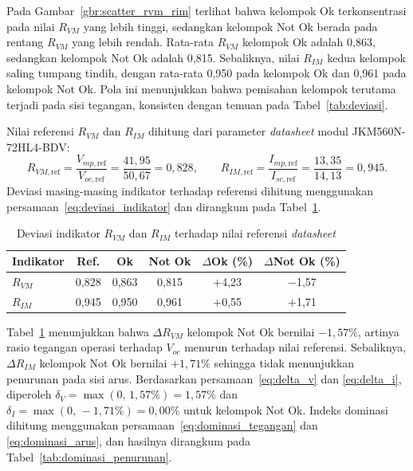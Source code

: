 Pada Gambar~\ref{gbr:scatter_rvm_rim} terlihat bahwa kelompok Ok terkonsentrasi
pada nilai $R_{VM}$ yang lebih tinggi, sedangkan kelompok Not Ok berada pada
rentang $R_{VM}$ yang lebih rendah. Rata-rata $R_{VM}$ kelompok Ok adalah
0,863, sedangkan kelompok Not Ok adalah 0,815. Sebaliknya, nilai $R_{IM}$ kedua
kelompok saling tumpang tindih, dengan rata-rata 0,950 pada kelompok Ok dan
0,961 pada kelompok Not Ok. Pola ini menunjukkan bahwa pemisahan kelompok
terutama terjadi pada sisi tegangan, konsisten dengan temuan pada
Tabel~\ref{tab:deviasi}.

Nilai referensi $R_{VM}$ dan $R_{IM}$ dihitung dari parameter \textit{datasheet}
modul JKM560N-72HL4-BDV:
\[
R_{VM,\text{ref}} = \frac{V_{mp,\text{ref}}}{V_{oc,\text{ref}}}
  = \frac{41{,}95}{50{,}67} = 0{,}828, \qquad
R_{IM,\text{ref}} = \frac{I_{mp,\text{ref}}}{I_{sc,\text{ref}}}
  = \frac{13{,}35}{14{,}13} = 0{,}945.
\]
Deviasi masing-masing indikator terhadap referensi dihitung menggunakan
persamaan~\eqref{eq:deviasi_indikator} dan dirangkum pada
Tabel~\ref{tab:rvm_rim_dev}.

\begin{table}[H]
\caption{Deviasi indikator $R_{VM}$ dan $R_{IM}$ terhadap nilai referensi
         \textit{datasheet}}
\label{tab:rvm_rim_dev}
\centering
\begin{tabular}{lccccc}
\toprule
\textbf{Indikator} & \textbf{Ref.} &
\textbf{Ok} & \textbf{Not Ok} &
\textbf{$\Delta$Ok (\%)} & \textbf{$\Delta$Not Ok (\%)} \\
\midrule
$R_{VM}$ & 0,828 & 0,863 & 0,815 & $+$4,23 & $-$1,57 \\
$R_{IM}$ & 0,945 & 0,950 & 0,961 & $+$0,55 & $+$1,71 \\
\bottomrule
\end{tabular}
\end{table}

Tabel~\ref{tab:rvm_rim_dev} menunjukkan bahwa $\Delta R_{VM}$ kelompok Not Ok
bernilai $-1{,}57\%$, artinya rasio tegangan operasi terhadap $V_{oc}$ menurun
terhadap nilai referensi. Sebaliknya, $\Delta R_{IM}$ kelompok Not Ok bernilai
$+1{,}71\%$ sehingga tidak menunjukkan penurunan pada sisi arus. Berdasarkan
persamaan~\eqref{eq:delta_v} dan \eqref{eq:delta_i}, diperoleh
$\delta_V = \max(0,\,1{,}57\%) = 1{,}57\%$ dan
$\delta_I = \max(0,\,-1{,}71\%) = 0{,}00\%$ untuk kelompok Not Ok. Indeks
dominasi dihitung menggunakan persamaan~\eqref{eq:dominasi_tegangan} dan
\eqref{eq:dominasi_arus}, dan hasilnya dirangkum pada
Tabel~\ref{tab:dominasi_penurunan}.

